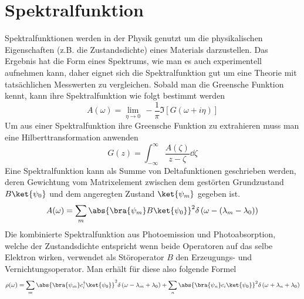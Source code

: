 \section{Spektralfunktion}
Spektralfunktionen werden in der Physik genutzt um die physikalischen Eigenschaften (z.B. die Zustandsdichte) eines Materials darzustellen.\cite{Lin} Das Ergebnis hat die Form eines Spektrums, wie man es auch experimentell aufnehmen kann, daher eignet sich die Spektralfunktion gut um eine Theorie mit tatsächlichen Messwerten zu vergleichen.
Sobald man die Greensche Funktion kennt, kann ihre Spektralfunktion wie folgt bestimmt werden
\begin{equation}\label{G2A}
A(\omega)= \lim\limits_{\eta \rightarrow 0}\,-\frac{1}{\pi}\Im\left[ G(\omega+i\eta)\right] 
\end{equation}
Um aus einer Spektralfunktion ihre Greensche Funktion zu extrahieren muss man eine Hilberttransformation anwenden
\begin{equation}\label{A2G}
G(z) = \int_{-\infty}^{\infty}\frac{A(\zeta)}{z- \zeta}\dd{\zeta}
\end{equation}
\cite{Rickayzen,schoett2014}
Eine Spektralfunktion kann als Summe von Deltafunktionen geschrieben werden, deren Gewichtung vom Matrixelement zwischen dem gestörten Grundzustand $ B\ket{\psi_0} $ und dem angeregten Zustand $ \ket{\psi_m} $ gegeben ist.
\begin{equation}\label{deltasum}
A(\omega) =\sum_{m}\abs{\bra{\psi_m}B\ket{\psi_0}}^2\delta\left( \omega-(\lambda_m-\lambda_0)\right) 
\end{equation}
Die kombinierte Spektralfunktion aus Photoemission und Photoabsorption, welche der Zustandsdichte entspricht wenn beide Operatoren auf das selbe Elektron wirken, verwendet als Störoperator $ B $ den Erzeugungs- und Vernichtungsoperator. Man erhält für diese also folgende Formel
\begin{equation}\label{rho}
\rho(\omega) = \sum_{m}\abs{\bra{\psi_m}c^\dagger_i\ket{\psi_0}}^2\delta\left( \omega -\lambda_m +\lambda_0\right) + \sum_{n}\abs{\bra{\psi_n}c_i\ket{\psi_0}}^2\delta\left( \omega +\lambda_n + \lambda_0\right)
\end{equation}

